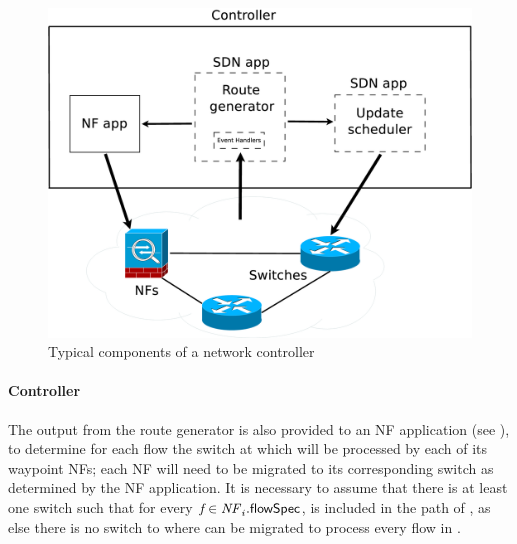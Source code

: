 \begin{figure}
\centering
\includegraphics[width=0.8\columnwidth]{system.eps}
\caption{Typical components of a network controller}
\label{fig:architecture}
\end{figure}


\paragraph{Controller} The output from the route generator is also
provided to an NF application (see ), to
determine for each flow \flowID{} the switch at which \flowID{} will
be processed by each of its waypoint NFs; each NF will need to be
migrated to its corresponding switch as determined by the NF
application. It is necessary to assume that there is at least one
switch \switchID{} such that for every $\flowID{} \in
\nfID{\nfIdx}{}{\flowSpec}$, \switchID{} is included in the path of
\flowID{}, as else there is no switch to where \nfID{\nfIdx} can be
migrated to process every flow in \nfID{\nfIdx}{}{\flowSpec}.

